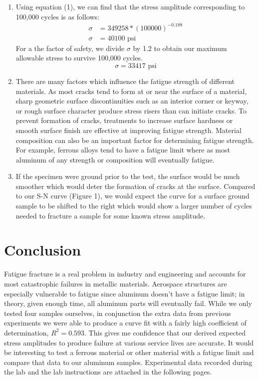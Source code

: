 \documentclass{article}
\begin{document}
\begin{multicols}{2}
\begin{enumerate}
\item Using equation (1), we can find that the stress amplitude corresponding to 100,000 cycles is as follows:
\begin{align*}
\sigma &= 349258*(100000)^{-0.188} \\
\sigma &= 40100 \textrm{ psi}
\end{align*}
For a the factor of safety, we divide $\sigma$ by 1.2 to obtain our maximum allowable stress to survive 100,000 cycles. 
\begin{equation}
\sigma = 33417 \textrm{ psi}
\end{equation}
\item There are many factors which influence the fatigue strength of different materials. As most cracks tend to form at or near the surface of a material, sharp geometric surface discontinuities such as an interior corner or keyway, or rough surface character  produce stress risers than can initiate cracks. To prevent formation of cracks, treatments to increase surface hardness or smooth surface finish are effective at improving fatigue strength. Material composition can also be an important factor for determining fatigue strength. For example, ferrous alloys tend to have a fatigue limit where as most aluminum of any strength or composition will eventually fatigue.
\item
If the specimen were ground prior to the test, the surface would be much smoother which would deter the formation of cracks at the surface. Compared to our S-N curve (Figure 1), we would expect the curve for a surface ground sample to be shifted to the right which would show a larger number of cycles needed to fracture a sample for some known stress amplitude.

\end{enumerate}
\end{multicols}

\section{Conclusion}
Fatigue fracture is a real problem in industry and engineering and accounts for most catastrophic failures in metallic materials. Aerospace structures are especially vulnerable to fatigue since aluminum doesn't have a fatigue limit; in theory, given enough time, all aluminum parts will eventually fail. While we only tested four samples ourselves, in conjunction the extra data from previous experiments we were able to produce a curve fit with a fairly high coefficient of determination, $R^2 = 0.593$. This gives me confidence that our derived expected stress amplitudes to produce failure at various service lives are accurate. It would be interesting to test a ferrous material or other material with a fatigue limit and compare that data to our aluminum samples.
Experimental data recorded during the lab and the lab instructions are attached in the following pages.
\end{document}
